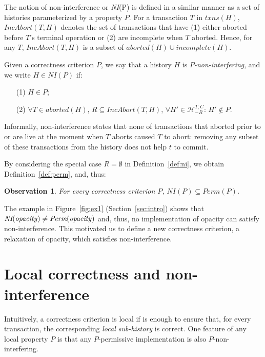 \documentclass{llncs}
\newcommand{\cmnt}[1]{}
\newtheorem{observation}[theorem]{Observation}
\newcommand{\secref}[1]{Section~\ref{sec:#1}}
\def\H{\ensuremath{\mathcal{H}}}
\newcommand{\id}[1]{\mbox{\textit{#1}}}\newcommand{\res}[1]{\mbox{\textbf{#1}}}
\newcommand{\termop} {terminal operation}
\newcommand{\nonin} {non-interference}
\newcommand{\aborted}{\textit{aborted}}
\newcommand{\txns}{\textit{txns}}
\newcommand{\permfn}[1] {\textit{Perm}(#1)}
\newcommand{\nifn}[1] {\textit{NI}(#1)}
\newcommand{\prevA}[2] {\textit{IncAbort}(#1, #2)}
\begin{document}
The notion of \nonin{} or \nifn{P} is defined in a similar manner 
as a set of histories parameterized by a property $P$. 
For a transaction $T$ in $\txns(H)$, $\prevA{T}{H}$ denotes the set of
transactions that have (1) either aborted before $T$'s \termop{} or
(2) are incomplete when $T$ aborted. Hence, for any $T$,
$\prevA{T}{H}$ is a subset of $aborted(H) \cup incomplete(H)$. 



\begin{definition}
\label{def:ni}
Given a correctness criterion $P$, we say that a history $H$ is
\emph{$P$-non-interfering}, and we write $H \in \nifn{P}$ if: 
\begin{enumerate}
\item[(1)] $H \in P$; 
\item[(2)] $\forall T \in \aborted(H)$, $R \subseteq \prevA{T}{H}$, 
$\forall H' \in \H^{T,C}_{-R}$:  $H' \notin P$. 
\end{enumerate}
\end{definition} 
Informally, \nonin{} states that none of transactions that
aborted prior to or are live at the moment when $T$ aborts caused $T$
to abort: removing any subset of these transactions from the history
does not help $t$ to commit.
\cmnt{By considering $\overline{H}$ in condition (2), we treat all
incomplete transactions in $H$ as aborted. It can be seen that $S$ (in
condition (2) above) could be an empty set. }
By considering the special case $R=\emptyset$ in Definition~\ref{def:ni}, we
obtain Definition~\ref{def:perm}, and, thus:
\begin{observation}
For every correctness criterion $P$, 
$\nifn{P}\subseteq \permfn{P}$. 
\end{observation}
The example in Figure~\ref{fig:ex1} (\secref{intro}) shows 
that $\nifn{\id{opacity}}\neq \permfn{\id{opacity}}$ and, thus, 
no implementation of opacity can
satisfy \nonin. 
This motivated us to define a new correctness
criterion, a relaxation of opacity, 
which satisfies \nonin. 


\section{Local correctness and non-interference}
\label{sec:local}

Intuitively, a correctness criterion is local if is enough to ensure
that, for every transaction, the corresponding \emph{local sub-history}
is correct. One feature of any local property $P$ is that any $P$-permissive
implementation is also $P$-non-interfering.  
\end{document}
